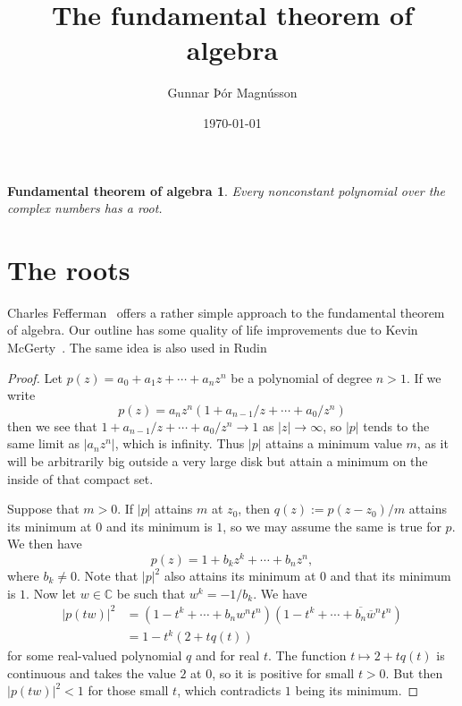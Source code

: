 \documentclass[11pt,draft]{article}
\author{Gunnar Þór Magnússon}
\date{\today}
\title{The fundamental theorem of algebra}
\newtheorem*{fundamental}{Fundamental theorem of algebra}
\newcommand{\kk}[1]{\mathbb{#1}}
\def\ov#1{\overline{#1}}
\begin{document}
\maketitle



\begin{fundamental}
Every nonconstant polynomial over the complex numbers has a root.
\end{fundamental}



\section{The roots}


Charles Fefferman~\cite{fefferman} offers a rather simple approach to the
fundamental theorem of algebra.
Our outline has some quality of life improvements due to Kevin McGerty~\cite{kevin}.
The same idea is also used in Rudin~\cite[Chapter 8]{rudin1976principles}

\begin{proof}
Let $p(z) = a_0 + a_1 z + \cdots + a_n z^n$ be a polynomial of degree $n > 1$.
If we write
\[
    p(z) = a_n z^n (1 + a_{n-1}/z + \cdots + a_0/z^n)
\]
then we see that $1 + a_{n-1}/z + \cdots + a_0/z^n \to 1$ as $|z| \to \infty$,
so $|p|$ tends to the same limit as $|a_n z^n|$, which is infinity.
Thus $|p|$ attains a minimum value $m$, as it will be arbitrarily big outside
a very large disk but attain a minimum on the inside of that compact set.

Suppose that $m > 0$. If $|p|$ attains $m$ at $z_0$, then $q(z) := p(z-z_0)/m$
attains its minimum at $0$ and its minimum is $1$, so we may assume the same is
true for $p$. We then have
\[
    p(z) = 1 + b_k z^k + \cdots + b_n z^n,
\]
where $b_k \not= 0$.
Note that $|p|^2$ also attains its minimum at $0$ and that its minimum is $1$.
Now let $w \in \kk C$ be such that $w^k = -1/b_k$.
We have
\begin{align*}
    |p(tw)|^2
    &= (1 - t^k + \cdots + b_n w^n t^n)
    (1 - t^k + \cdots + \ov{b_n}\ov w^n t^n)
    \\
    &= 1 - t^k(2 + t q(t))
\end{align*}
for some real-valued polynomial $q$ and for real $t$.
The function $t \mapsto 2 + tq(t)$ is continuous and takes the value $2$ at $0$,
so it is positive for small $t > 0$.
But then $|p(tw)|^2 < 1$ for those small $t$, which contradicts $1$ being its
minimum.
\end{proof}
\end{document}
